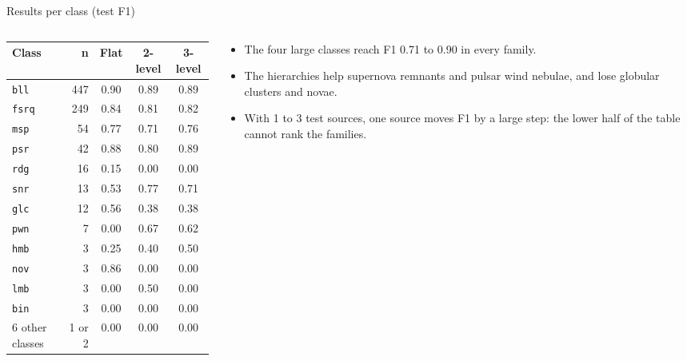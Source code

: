 \documentclass[aspectratio=169, 10pt]{beamer}
\newcommand{\cls}[1]{\texttt{#1}}
\begin{document}
\begin{frame}{Results per class (test F1)}
  \begin{columns}[T]
    \begin{column}{0.5\textwidth}
      \centering\scriptsize
      \begin{tabular}{lrccc}
        \toprule
        Class & n & Flat & 2-level & 3-level \\
        \midrule
        \cls{bll} & 447 & 0.90 & 0.89 & 0.89 \\
        \cls{fsrq} & 249 & 0.84 & 0.81 & 0.82 \\
        \cls{msp} & 54 & 0.77 & 0.71 & 0.76 \\
        \cls{psr} & 42 & 0.88 & 0.80 & 0.89 \\
        \cls{rdg} & 16 & 0.15 & 0.00 & 0.00 \\
        \cls{snr} & 13 & 0.53 & 0.77 & 0.71 \\
        \cls{glc} & 12 & 0.56 & 0.38 & 0.38 \\
        \cls{pwn} & 7 & 0.00 & 0.67 & 0.62 \\
        \cls{hmb} & 3 & 0.25 & 0.40 & 0.50 \\
        \cls{nov} & 3 & 0.86 & 0.00 & 0.00 \\
        \cls{lmb} & 3 & 0.00 & 0.50 & 0.00 \\
        \cls{bin} & 3 & 0.00 & 0.00 & 0.00 \\
        6 other classes & 1 or 2 & 0.00 & 0.00 & 0.00 \\
        \bottomrule
      \end{tabular}
    \end{column}
    \begin{column}{0.47\textwidth}
      \small
      \begin{itemize}
        \item The four large classes reach F1 0.71 to 0.90 in every family.
        \item The hierarchies help supernova remnants and pulsar wind nebulae, and lose globular
              clusters and novae.
        \item With 1 to 3 test sources, one source moves F1 by a large step: the lower half of
              the table cannot rank the families.
      \end{itemize}
    \end{column}
  \end{columns}
\end{frame}
\end{document}
